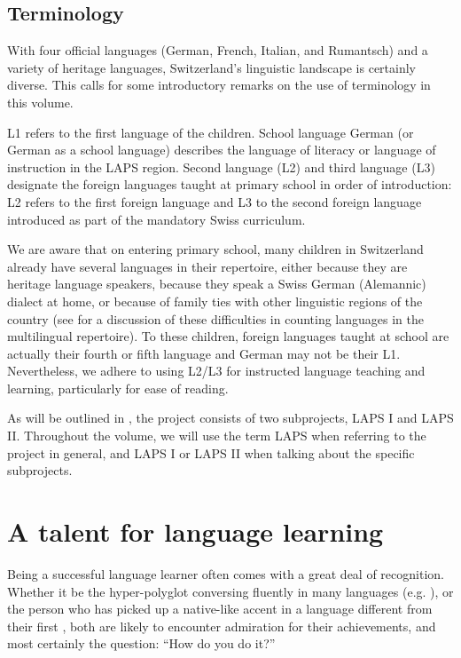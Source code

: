 \documentclass[output=paper]{langsci/langscibook}
\begin{document}
\subsection{Terminology}

With four official languages (German, French, Italian, and Rumantsch) and a variety of heritage languages, Switzerland’s linguistic landscape is certainly diverse. This calls for some introductory remarks on the use of terminology in this volume. 

L1 refers to the first language of the children. School language German (or German as a school language) describes the language of literacy or language of instruction in the LAPS region. Second language (L2) and third language (L3) designate the foreign languages taught at primary school in order of introduction: L2 refers to the first foreign language and L3 to the second foreign language introduced as part of the mandatory Swiss curriculum. 

We are aware that on entering primary school, many children in Switzerland already have several languages in their repertoire, either because they are heritage language speakers, because they speak a Swiss German (Alemannic) dialect at home, or because of family ties with other linguistic regions of the country (see \citealt{Berthele2020} for a discussion of these difficulties in counting languages in the multilingual repertoire). To these children, foreign languages taught at school are actually their fourth or fifth language and German may not be their L1. Nevertheless, we adhere to using L2/L3 for instructed language teaching and learning, particularly for ease of reading.

As will be outlined in , the project consists of two subprojects, LAPS I and LAPS II. Throughout the volume, we will use the term LAPS when referring to the project in general, and LAPS I or LAPS II when talking about the specific subprojects.

\section{A talent for language learning} 

Being a successful language learner often comes with a great deal of recognition. Whether it be the hyper-polyglot conversing fluently in many languages (e.g. \citealt{Erard2012}), or the person who has picked up a native-like accent in a language different from their first \citep{FlegeMackay2011,ChristinerReiterer2015}, both are likely to encounter admiration for their achievements, and most certainly the question: “How do you do it?” 
\end{document}
